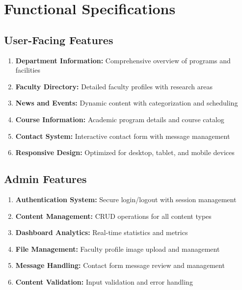 \documentclass[12pt,a4paper]{report}
\begin{document}
\section{Functional Specifications}

\subsection{User-Facing Features}
\begin{enumerate}
    \item \textbf{Department Information:} Comprehensive overview of programs and facilities
    \item \textbf{Faculty Directory:} Detailed faculty profiles with research areas
    \item \textbf{News and Events:} Dynamic content with categorization and scheduling
    \item \textbf{Course Information:} Academic program details and course catalog
    \item \textbf{Contact System:} Interactive contact form with message management
    \item \textbf{Responsive Design:} Optimized for desktop, tablet, and mobile devices
\end{enumerate}

\subsection{Admin Features}
\begin{enumerate}
    \item \textbf{Authentication System:} Secure login/logout with session management
    \item \textbf{Content Management:} CRUD operations for all content types
    \item \textbf{Dashboard Analytics:} Real-time statistics and metrics
    \item \textbf{File Management:} Faculty profile image upload and management
    \item \textbf{Message Handling:} Contact form message review and management
    \item \textbf{Content Validation:} Input validation and error handling
\end{enumerate}
\end{document}
